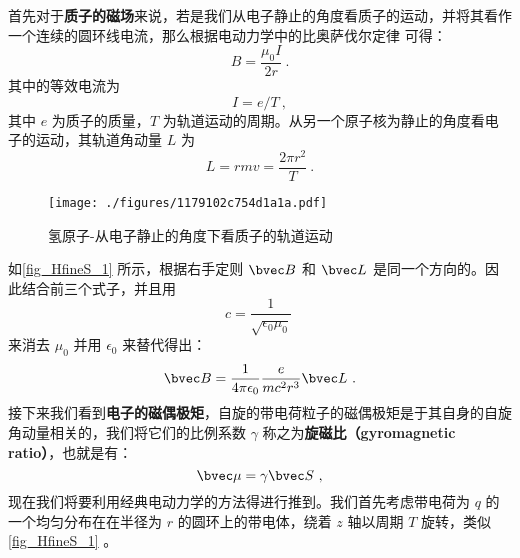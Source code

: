 首先对于\textbf{质子的磁场}来说，若是我们从电子静止的角度看质子的运动，并将其看作一个连续的圆环线电流，那么根据电动力学中的比奥萨伐尔定律 可得：
\begin{equation}
B=\frac{\mu_0I}{2r}~.
\end{equation}
其中的等效电流为
\begin{equation}
I=e/T~,
\end{equation}
其中 $e$ 为质子的质量，$T$ 为轨道运动的周期。从另一个原子核为静止的角度看电子的运动，其轨道角动量 $L$ 为
\begin{equation}
L=rmv=\frac{2\pi r^2}{T}~.
\end{equation}
\begin{figure}[ht]
\centering
\texttt{[image: ./figures/1179102c754d1a1a.pdf]}
\caption{氢原子-从电子静止的角度下看质子的轨道运动} \label{fig_HfineS_1}
\end{figure}
如\autoref{fig_HfineS_1} 所示，根据右手定则 $\bvec B$ 和 $\bvec L$ 是同一个方向的。因此结合前三个式子，并且用
\begin{equation}
c=\frac{1}{\sqrt{\epsilon_0\mu_0}}~
\end{equation}
来消去 $\mu_0$ 并用 $\epsilon_0$ 来替代得出：
\begin{equation}\label{eq_HfineS_31}
\bvec B = \frac{1}{4\pi\epsilon_0}\frac{e}{mc^2r^3}\bvec L~.
\end{equation}
接下来我们看到\textbf{电子的磁偶极矩}，自旋的带电荷粒子的磁偶极矩是于其自身的自旋角动量相关的，我们将它们的比例系数 $\gamma$ 称之为\textbf{旋磁比（gyromagnetic
ratio）}，也就是有：
\begin{equation}
\bvec\mu=\gamma\bvec S~,
\end{equation}
现在我们将要利用经典电动力学的方法得进行推到。我们首先考虑带电荷为 $q$ 的一个均匀分布在在半径为 $r$ 的圆环上的带电体，绕着 $z$ 轴以周期 $T$ 旋转，类似\autoref{fig_HfineS_1} 。


